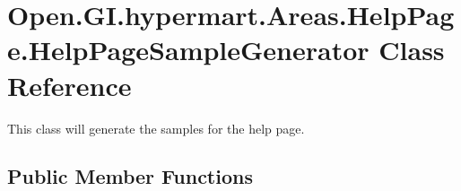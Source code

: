 \hypertarget{class_open_1_1_g_i_1_1hypermart_1_1_areas_1_1_help_page_1_1_help_page_sample_generator}{}\section{Open.\+G\+I.\+hypermart.\+Areas.\+Help\+Page.\+Help\+Page\+Sample\+Generator Class Reference}
\label{class_open_1_1_g_i_1_1hypermart_1_1_areas_1_1_help_page_1_1_help_page_sample_generator}


This class will generate the samples for the help page.  


\subsection*{Public Member Functions}
